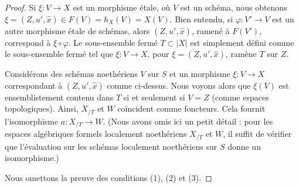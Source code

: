 \begin{proof}
\medskip\noindent
Si $\xi : V \to X$ est un morphisme \'etale, où $V$ est un schéma, nous
obtenons $\xi = (Z, u', \hat x) \in F(V) = h_X(V) = X(V)$. Bien entendu, si
$\varphi : V' \to V$ est un autre morphisme \'etale de schémas, alors
$(Z, u', \hat x)$, ramené à $F(V')$, correspond à $\xi \circ \varphi$.
Le sous-ensemble fermé $T \subset |X|$ est simplement défini comme le
sous-ensemble fermé tel que $\xi : V \to X$, pour
$\xi = (Z, u', \hat x)$, ramène $T$ sur $Z$.

\medskip\noindent
Considérons des schémas noethériens $V$ sur $S$ et un morphisme
$\xi : V \to X$ correspondant à $(Z, u', \hat x)$ comme ci-dessus. Nous
voyons alors que $\xi(V)$ est ensemblistement contenu dans $T$ si et seulement
si $V = Z$ (comme espaces topologiques). Ainsi, $X_{/T}$ et $W$ coïncident
comme foncteurs. Cela fournit l'isomorphisme $a : X_{/T} \to W$. (Nous avons
omis ici un petit détail : pour les espaces algébriques formels localement
noethériens $X_{/T}$ et $W$, il suffit de vérifier que l'évaluation sur les
schémas localement noethériens sur $S$ donne un isomorphisme.)

\medskip\noindent
Nous omettons la preuve des conditions (1), (2) et (3).
\end{proof}

